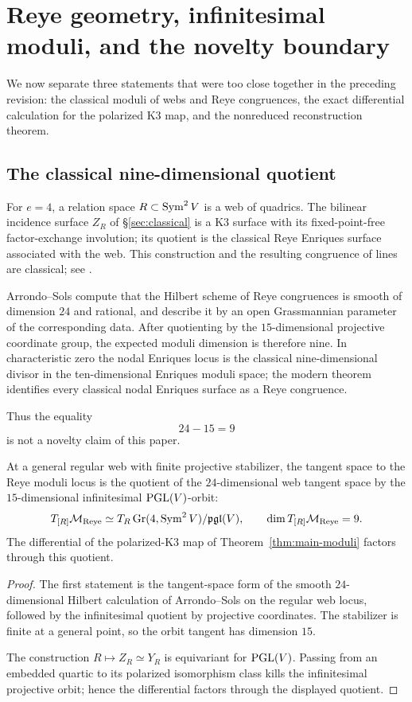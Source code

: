 \section{Reye geometry, infinitesimal moduli, and the novelty boundary}
\label{sec:reye-priority}

We now separate three statements that were too close together in the
preceding revision: the classical moduli of webs and Reye congruences,
the exact differential calculation for the polarized K3 map, and the
nonreduced reconstruction theorem.

\subsection{The classical nine-dimensional quotient}

For $e=4$, a relation space $R\subset\operatorname{Sym}^2V$ is a web of quadrics.
The bilinear incidence surface $Z_R$ of
\S\ref{sec:classical} is a K3 surface with its fixed-point-free
factor-exchange involution; its quotient is the classical Reye
Enriques surface associated with the web.  This construction and the
resulting congruence of lines are classical; see
\cite{Cossec,ArrondoSols,DolgachevReider,IK,DK,MMV}.

Arrondo--Sols compute that the Hilbert scheme of Reye congruences is
smooth of dimension $24$ and rational, and describe it by an open
Grassmannian parameter of the corresponding data.  After quotienting
by the $15$-dimensional projective coordinate group, the expected
moduli dimension is therefore nine.  In characteristic zero the
nodal Enriques locus is the classical nine-dimensional divisor in the
ten-dimensional Enriques moduli space; the modern theorem
\cite{MMV} identifies every classical nodal Enriques surface as a
Reye congruence.

Thus the equality
\[
 24-15=9
\]
is not a novelty claim of this paper.

\begin{proposition}
\label{prop:reye-tangent}
At a general regular web with finite projective stabilizer, the tangent
space to the Reye moduli locus is the quotient of the $24$-dimensional
web tangent space by the $15$-dimensional infinitesimal
$\operatorname{PGL}(V)$-orbit:
\[
 T_{[R]}\mathcal M_{\mathrm{Reye}}
 \simeq
 T_R\operatorname{Gr}(4,\operatorname{Sym}^2V)/\mathfrak{pgl}(V),
 \qquad
 \dim T_{[R]}\mathcal M_{\mathrm{Reye}}=9.
\]
The differential of the polarized-K3 map of
Theorem~\ref{thm:main-moduli} factors through this quotient.
\end{proposition}
\begin{proof}
The first statement is the tangent-space form of the smooth
$24$-dimensional Hilbert calculation of Arrondo--Sols on the regular
web locus, followed by the infinitesimal quotient by projective
coordinates.  The stabilizer is finite at a general point, so the
orbit tangent has dimension $15$.

The construction $R\mapsto Z_R\simeq Y_R$ is equivariant for
$\operatorname{PGL}(V)$.  Passing from an embedded quartic to its polarized
isomorphism class kills the infinitesimal projective orbit; hence the
differential factors through the displayed quotient.
\end{proof}

